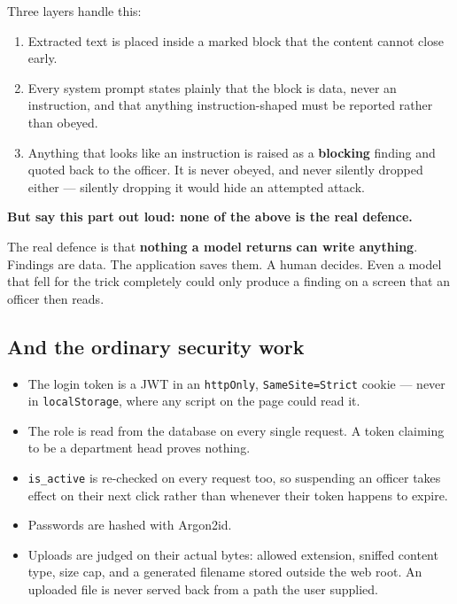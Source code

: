 \documentclass[11pt,a4paper]{article}
\newcommand{\keyline}[1]{%
  \par\vspace{4pt}%
  \noindent\colorbox{shade}{\parbox{\dimexpr\linewidth-2\fboxsep}{\textbf{#1}}}%
  \par\vspace{6pt}%
}
\begin{document}
Three layers handle this:

\begin{enumerate}
  \item Extracted text is placed inside a marked block that the content cannot
        close early.
  \item Every system prompt states plainly that the block is data, never an
        instruction, and that anything instruction-shaped must be reported
        rather than obeyed.
  \item Anything that looks like an instruction is raised as a \textbf{blocking}
        finding and quoted back to the officer. It is never obeyed, and never
        silently dropped either --- silently dropping it would hide an attempted
        attack.
\end{enumerate}

\keyline{But say this part out loud: none of the above is the real defence.}

The real defence is that \textbf{nothing a model returns can write anything}.
Findings are data. The application saves them. A human decides. Even a model
that fell for the trick completely could only produce a finding on a screen that
an officer then reads.

\subsection{And the ordinary security work}

\begin{itemize}
  \item The login token is a JWT in an \texttt{httpOnly}, \texttt{SameSite=Strict}
        cookie --- never in \texttt{localStorage}, where any script on the page
        could read it.
  \item The role is read from the database on every single request. A token
        claiming to be a department head proves nothing.
  \item \texttt{is\_active} is re-checked on every request too, so suspending an
        officer takes effect on their next click rather than whenever their
        token happens to expire.
  \item Passwords are hashed with Argon2id.
  \item Uploads are judged on their actual bytes: allowed extension, sniffed
        content type, size cap, and a generated filename stored outside the web
        root. An uploaded file is never served back from a path the user supplied.
\end{itemize}
\end{document}
